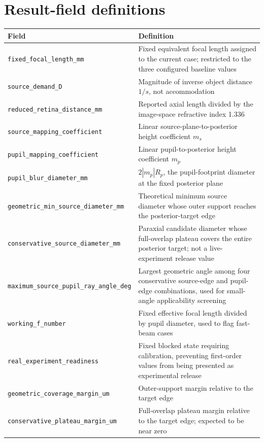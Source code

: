 \documentclass[11pt,openany]{report}
\newcommand{\sourcefile}[1]{\nolinkurl{#1}}
\begin{document}
\appendix
\chapter{Result-field definitions}
\begin{longtable}{p{5.4cm}p{9.4cm}}
\toprule
Field & Definition\\
\midrule
\sourcefile{fixed\_focal\_length\_mm} & Fixed equivalent focal length assigned to the current case; restricted to the three configured baseline values\\
\sourcefile{source\_demand\_D} & Magnitude of inverse object distance $1/s$, not accommodation\\
\sourcefile{reduced\_retina\_distance\_mm} & Reported axial length divided by the image-space refractive index 1.336\\
\sourcefile{source\_mapping\_coefficient} & Linear source-plane-to-posterior height coefficient $m_s$\\
\sourcefile{pupil\_mapping\_coefficient} & Linear pupil-to-posterior height coefficient $m_p$\\
\sourcefile{pupil\_blur\_diameter\_mm} & $2|m_p|R_p$, the pupil-footprint diameter at the fixed posterior plane\\
\sourcefile{geometric\_min\_source\_diameter\_mm} & Theoretical minimum source diameter whose outer support reaches the posterior-target edge\\
\sourcefile{conservative\_source\_diameter\_mm} & Paraxial candidate diameter whose full-overlap plateau covers the entire posterior target; not a live-experiment release value\\
\sourcefile{maximum\_source\_pupil\_ray\_angle\_deg} & Largest geometric angle among four conservative source-edge and pupil-edge combinations, used for small-angle applicability screening\\
\sourcefile{working\_f\_number} & Fixed effective focal length divided by pupil diameter, used to flag fast-beam cases\\
\sourcefile{real\_experiment\_readiness} & Fixed blocked state requiring calibration, preventing first-order values from being presented as experimental release\\
\sourcefile{geometric\_coverage\_margin\_um} & Outer-support margin relative to the target edge\\
\sourcefile{conservative\_plateau\_margin\_um} & Full-overlap plateau margin relative to the target edge; expected to be near zero\\
\bottomrule
\end{longtable}
\end{document}
